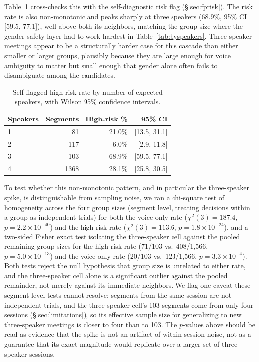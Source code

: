\documentclass[conference,a4paper]{IEEEtran}
\begin{document}
Table~\ref{tab:fprisk} cross-checks this with the self-diagnostic risk
flag (\S\ref{sec:fprisk}). The risk rate is also non-monotonic and
peaks sharply at three speakers (68.9\%, 95\% CI [59.5, 77.1]), well
above both its
neighbors, matching the group size where the gender-safety layer had
to work hardest in Table~\ref{tab:byspeakers}. Three-speaker meetings
appear to be a structurally harder case for this cascade than either
smaller or larger groups, plausibly because they are large enough for
voice ambiguity to matter but small enough that gender alone often
fails to disambiguate among the candidates.

\begin{table}[h]
\centering
\caption{Self-flagged high-risk rate by number of expected speakers, with Wilson 95\% confidence intervals.}
\label{tab:fprisk}
\footnotesize
\begin{tabular}{lrrr}
\toprule
\textbf{Speakers} & \textbf{Segments} & \textbf{High-risk \%} & \textbf{95\% CI} \\
\midrule
1 &   81 & 21.0\% & [13.5, 31.1] \\
2 &  117 &  6.0\% & [\phantom{0}2.9, 11.8] \\
3 &  103 & 68.9\% & [59.5, 77.1] \\
4 & 1368 & 28.1\% & [25.8, 30.5] \\
\bottomrule
\end{tabular}
\end{table}

To test whether this non-monotonic pattern, and in particular the
three-speaker spike, is distinguishable from sampling noise, we ran a
chi-square test of homogeneity across the four group sizes (segment
level, treating decisions within a group as independent trials) for
both the voice-only rate ($\chi^2(3){=}187.4$, $p{=}2.2\times10^{-40}$)
and the high-risk rate ($\chi^2(3){=}113.6$, $p{=}1.8\times10^{-24}$),
and a two-sided Fisher exact test isolating the three-speaker cell
against the pooled remaining group sizes for the high-risk rate
(71/103 vs.\ 408/1{,}566, $p{=}5.0\times10^{-13}$) and the voice-only
rate (20/103 vs.\ 123/1{,}566, $p{=}3.3\times10^{-4}$). Both tests
reject the null hypothesis that group size is unrelated to either
rate, and the three-speaker cell alone is a significant outlier against
the pooled remainder, not merely against its immediate neighbors. We
flag one caveat these segment-level tests cannot resolve: segments
from the same session are not independent trials, and the
three-speaker cell's 103 segments come from only four sessions
(\S\ref{sec:limitations}), so its effective sample size for
generalizing to new three-speaker meetings is closer to four than to
103. The $p$-values above should be read as evidence that the spike is
not an artifact of within-session noise, not as a guarantee that its
exact magnitude would replicate over a larger set of three-speaker
sessions.
\end{document}
